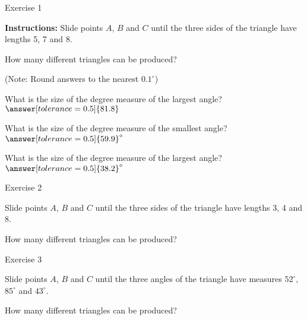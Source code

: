 \documentclass[number]{ximera}
\begin{document}
Exercise 1

{\bf {Instructions:}} Slide points $A$, $B$ and $C$ until the three sides of the triangle have lengths 5, 7 and 8. 

\begin{question}
How many different triangles can be produced?
\begin{multipleChoice}
\end{multipleChoice}

\begin{question}
(Note: Round answers to the nearest $0.1^\circ$)

What is the size of the degree measure of the largest angle? $\answer[tolerance=0.5]{81.8}$

What is the size of the degree measure of the smallest angle? $\answer[tolerance=0.5]{59.9}^\circ$

What is the size of the degree measure of the largest angle? $\answer[tolerance=0.5]{38.2}^\circ$
\end{question}
\end{question}

\bigskip


Exercise 2

Slide points $A$, $B$ and $C$ until the three sides of the triangle have lengths 3, 4 and 8. 

\begin{question}
How many different triangles can be produced?
\begin{multipleChoice}
\end{multipleChoice}

\end{question}

\bigskip


Exercise 3

Slide points $A$, $B$ and $C$ until the three angles of the triangle have measures $52^\circ$, $85^\circ$ and $43^\circ$. 

\begin{question}
How many different triangles can be produced?
\begin{multipleChoice}
\end{multipleChoice}

\end{question}
\end{document}
